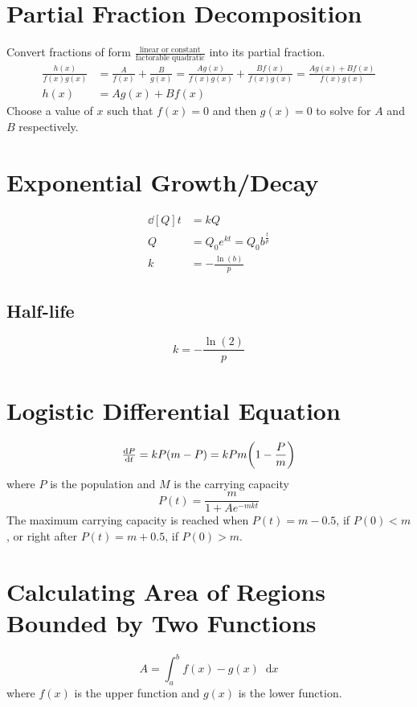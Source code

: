 \documentclass[12pt]{article}
\DeclarePairedDelimiter\paren{(}{)}
\newcommand*{\D}[1]{\mathop{}\!\mathrm{d}#1}
\newcommand*{\fixmath}{%
  \makebox{}\vspace{\glueexpr-\baselineskip-\abovedisplayskip}}
\newenvironment{fixaskip}{\setlength{\abovedisplayskip}{0pt}\fixmath%
  \ignorespaces}{\ignorespacesafterend}
\newenvironment{fixskip}{\setlength{\abovedisplayskip}{0pt}%
  \setlength{\belowdisplayskip}{0pt}\fixmath\ignorespaces}%
  {\ignorespacesafterend}
\begin{document}
\section*{Partial Fraction Decomposition}
Convert fractions of form \(\frac{\text{linear or constant}}{\text{factorable
quadratic}}\) into its partial fraction.
\begin{align*}
  \frac{h(x)}{f(x)g(x)} &= \frac{A}{f(x)} + \frac{B}{g(x)} = \frac{Ag(x)}
  {f(x)g(x)} + \frac{Bf(x)}{f(x)g(x)} = \frac{Ag(x) + Bf(x)}{f(x)g(x)}\\
  h(x) &= Ag(x) + Bf(x)
\end{align*}
Choose a value of \(x\) such that \(f(x) = 0\) and then \(g(x) = 0\) to solve
for \(A\) and \(B\) respectively.
\section*{Exponential Growth\slash Decay}
\begin{fixskip}
  \begin{align*}
    \dd[Q]{t} &= kQ\\
    Q &= Q_0 e^{kt} = Q_0 b^{\frac{t}{p}}\\
    k &= -\frac{\ln(b)}{p}
  \end{align*}
\end{fixskip}
\subsection*{Half-life}
\begin{fixskip}
  \[
    k = -\frac{\ln(2)}{p}
  \]
\end{fixskip}
\section*{Logistic Differential Equation}
\begin{fixaskip}
  \[
    \dd[P]{t} = kP(m - P) = kPm\paren*{1-\frac{P}{m}}
  \]
\end{fixaskip}
where \(P\) is the population and \(M\) is the carrying capacity
\[
  P(t) = \frac{m}{1 + Ae^{-mkt}}
\]
The maximum carrying capacity is reached when \(P(t) = m - 0.5\), if \(P(0) <
m\), or right after \(P(t) = m + 0.5\), if \(P(0) > m\).
\section*{Calculating Area of Regions Bounded by Two Functions}
\begin{fixaskip}
  \[
    A = \int_a^b f(x) - g(x) \D{x}
  \]
\end{fixaskip}
where \(f(x)\) is the upper function and \(g(x)\) is the lower function.
\end{document}
